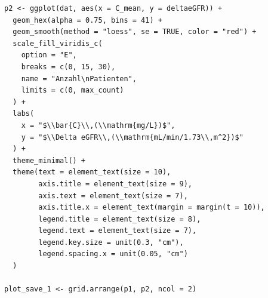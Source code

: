 \documentclass[a4paper,12pt]{article}
\begin{document}
\begin{lstlisting}[caption={Code für Abbildung \ref{fig:abb3}}, label = lst:abb3, style=mystyle, escapeinside=``]
p2 <- ggplot(dat, aes(x = C_mean, y = deltaeGFR)) +
  geom_hex(alpha = 0.75, bins = 41) +
  geom_smooth(method = "loess", se = TRUE, color = "red") +
  scale_fill_viridis_c(
    option = "E",
    breaks = c(0, 15, 30),
    name = "Anzahl\nPatienten",
    limits = c(0, max_count)
  ) +
  labs(
    x = "$\\bar{C}\\,(\\mathrm{mg/L})$",
    y = "$\\Delta eGFR\\,(\\mathrm{mL/min/1.73\\,m^2})$"
  ) +
  theme_minimal() +
  theme(text = element_text(size = 10),
        axis.title = element_text(size = 9),
        axis.text = element_text(size = 7),
        axis.title.x = element_text(margin = margin(t = 10)),
        legend.title = element_text(size = 8),
        legend.text = element_text(size = 7),
        legend.key.size = unit(0.3, "cm"),
        legend.spacing.x = unit(0.05, "cm")
  )

plot_save_1 <- grid.arrange(p1, p2, ncol = 2)
\end{lstlisting}
\end{document}
